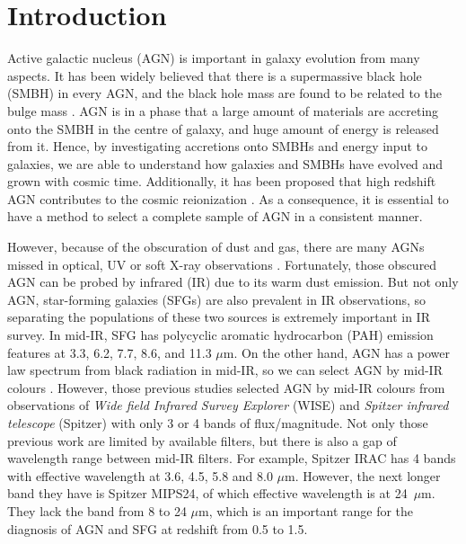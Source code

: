 \documentclass[a4paper,fleqn,usenatbib]{mnras}
\begin{document}
\section{Introduction}
Active galactic nucleus (AGN) is important in galaxy evolution from many aspects. It has been widely believed that there is a supermassive black hole (SMBH) in every AGN, and the black hole mass are found to be related to the bulge mass \citep[e.g.,][]{Magorrian et al. 1998}. AGN is in a phase that a large amount of materials are accreting onto the SMBH in the centre of galaxy, and huge amount of energy is released from it. Hence, by investigating accretions onto SMBHs and energy input to galaxies, we are able to understand how galaxies and SMBHs have evolved and grown with cosmic time. Additionally, it has been proposed that high redshift AGN contributes to the cosmic reionization \citep[e.g.,][]{Glikman et al. 2010,Madau P. and Haardt F. 2015}. As a consequence, it is essential to have a method to select a complete sample of AGN in a consistent manner. 

However, because of the obscuration of dust and gas, there are many AGNs missed in optical, UV or soft X-ray observations \citep[e.g.,][]{Alexander et al. 2001,Richard et al. 2003,Webster et al. 1995}. Fortunately, those obscured AGN can be probed by infrared (IR) due to its warm dust emission. But not only AGN, star-forming galaxies (SFGs) are also prevalent in IR observations, so separating the populations of these two sources is extremely important in IR survey. In mid-IR, SFG has polycyclic aromatic hydrocarbon (PAH) emission features at 3.3, 6.2, 7.7, 8.6, and 11.3 $\mu$m. On the other hand, AGN has a power law spectrum from black radiation in mid-IR, so we can select AGN by mid-IR colours \citep{Jarrett et al. 2011,Lacy et al. 2004,Richard et al. 2006,Stern et al. 2005}. However, those previous studies selected AGN by mid-IR colours from observations of  \textit{Wide field Infrared Survey Explorer} (WISE) and \textit{Spitzer infrared telescope} (Spitzer) with only 3 or 4 bands of flux/magnitude. Not only those previous work are limited by available filters, but there is also a gap of wavelength range between mid-IR filters. For example,  Spitzer IRAC has 4 bands with effective wavelength at 3.6, 4.5, 5.8 and 8.0 $\mu$m. However, the next longer band they have is Spitzer MIPS24, of which effective wavelength is at 24~$\mu$m. They lack the band from 8 to 24 $\mu$m, which is an important range for the diagnosis of AGN and SFG at redshift from 0.5 to 1.5. 
\end{document}
